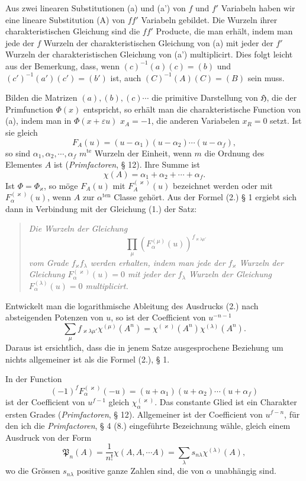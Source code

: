 \documentclass[11pt]{article}
\newcommand{\Hgr}{\mathfrak{H}}
\newcommand{\FrobP}{\mathfrak{P}}
\newcommand{\ten}{\mathrm{ten}}
\newcommand{\te}{\mathrm{te}}
\begin{document}
Aus zwei linearen Substitutionen (a) und (a') von $f$ und $f'$ Variabeln haben wir eine lineare Substitution (A) von $ff'$ Variabeln gebildet. Die Wurzeln ihrer charakteristischen Gleichung sind die $ff'$ Producte, die man erhält, indem man jede der $f$ Wurzeln der charakteristischen Gleichung von (a) mit jeder der $f'$ Wurzeln der charakteristischen Gleichung von (a') multiplicirt. Dies folgt leicht aus der Bemerkung, dass, wenn $(c)^{-1}(a)(c)=(b)$ und $(c')^{-1}(a')(c')=(b')$ ist, auch $(C)^{-1}(A)(C)=(B)$ sein muss.

Bilden die Matrizen $(a),(b),(c)\cdots$ die primitive Darstellung von $\Hgr$, die der Primfunction $\Phi(x)$ entspricht, so erhält man die charakteristische Function von (a), indem man in $\Phi(x+\varepsilon u)$ $x_A=-1$, die anderen Variabelen $x_R=0$ setzt. Ist sie gleich
\[
F_A(u)=(u-\alpha_1)(u-\alpha_2)\cdots(u-\alpha_f),
\]
so sind $\alpha_1,\alpha_2,\cdots,\alpha_f$ $m^{\te}$ Wurzeln der Einheit, wenn $m$ die Ordnung des Elementes $A$ ist (\emph{Primfactoren}, § 12). Ihre Summe ist
\begin{equation*}\tag{1.}
\chi(A)=\alpha_1+\alpha_2+\cdots+\alpha_f.
\end{equation*}
Ist $\Phi=\Phi_\varkappa$, so möge $F_A(u)$ mit $F_A^{(\varkappa)}(u)$ bezeichnet werden oder mit $F_\alpha^{(\varkappa)}(u)$, wenn $A$ zur $\alpha^{\ten}$ Classe gehört. Aus der Formel (2.) § 1 ergiebt sich dann in Verbindung mit der Gleichung (1.) der Satz:
\begin{quote}\itshape
Die Wurzeln der Gleichung
\begin{equation*}\tag{2.}
\prod_\mu\left(F_\alpha^{(\mu)}(u)\right)^{f_{\varkappa\lambda\mu'}}
\end{equation*}
vom Grade $f_\varkappa f_\lambda$ werden erhalten, indem man jede der $f_\varkappa$ Wurzeln der Gleichung $F_\alpha^{(\varkappa)}(u)=0$ mit jeder der $f_\lambda$ Wurzeln der Gleichung $F_\alpha^{(\lambda)}(u)=0$ multiplicirt.
\end{quote}
Entwickelt man die logarithmische Ableitung des Ausdrucks (2.) nach absteigenden Potenzen von $u$, so ist der Coefficient von $u^{-n-1}$
\[
\sum_\mu f_{\varkappa\lambda\mu'}\chi^{(\mu)}(A^n)
=\chi^{(\varkappa)}(A^n)\chi^{(\lambda)}(A^n).
\]
Daraus ist ersichtlich, dass die in jenem Satze ausgesprochene Beziehung um nichts allgemeiner ist als die Formel (2.), § 1.

In der Function
\begin{equation*}\tag{3.}
(-1)^f F_\alpha^{(\varkappa)}(-u)
=(u+\alpha_1)(u+\alpha_2)\cdots(u+\alpha_f)
\end{equation*}
ist der Coefficient von $u^{f-1}$ gleich $\chi_\alpha^{(\varkappa)}$. Das constante Glied ist ein Charakter ersten Grades (\emph{Primfactoren}, § 12). Allgemeiner ist der Coefficient von $u^{f-n}$, für den ich die \emph{Primfactoren}, § 4 (8.) eingeführte Bezeichnung wähle, gleich einem Ausdruck von der Form
\begin{equation*}\tag{4.}
\FrobP_n(A)=\frac{1}{n!}\chi(A,A,\cdots A)=\sum_\lambda s_{n\lambda}\chi^{(\lambda)}(A),
\end{equation*}
wo die Grössen $s_{n\lambda}$ positive ganze Zahlen sind, die von $\alpha$ unabhängig sind.
\end{document}
